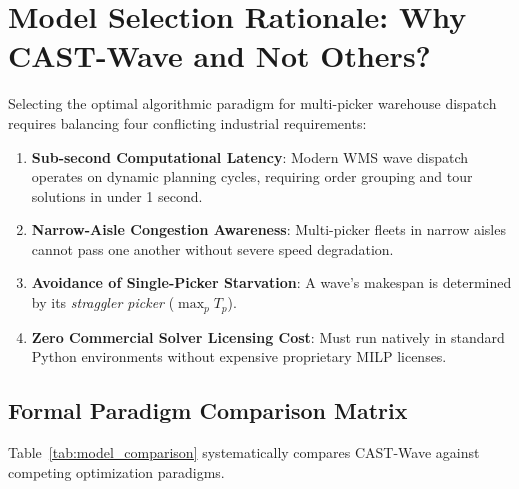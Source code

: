 \documentclass[11pt,a4paper]{article}
\begin{document}
\newpage
\section{Model Selection Rationale: Why CAST-Wave and Not Others?}

Selecting the optimal algorithmic paradigm for multi-picker warehouse dispatch requires balancing four conflicting industrial requirements:
\begin{enumerate}
    \item \textbf{Sub-second Computational Latency}: Modern WMS wave dispatch operates on dynamic planning cycles, requiring order grouping and tour solutions in under 1 second.
    \item \textbf{Narrow-Aisle Congestion Awareness}: Multi-picker fleets in narrow aisles cannot pass one another without severe speed degradation.
    \item \textbf{Avoidance of Single-Picker Starvation}: A wave's makespan is determined by its \emph{straggler picker} ($\max_p T_p$).
    \item \textbf{Zero Commercial Solver Licensing Cost}: Must run natively in standard Python environments without expensive proprietary MILP licenses.
\end{enumerate}

\subsection{Formal Paradigm Comparison Matrix}

Table~\ref{tab:model_comparison} systematically compares CAST-Wave against competing optimization paradigms.
\end{document}

